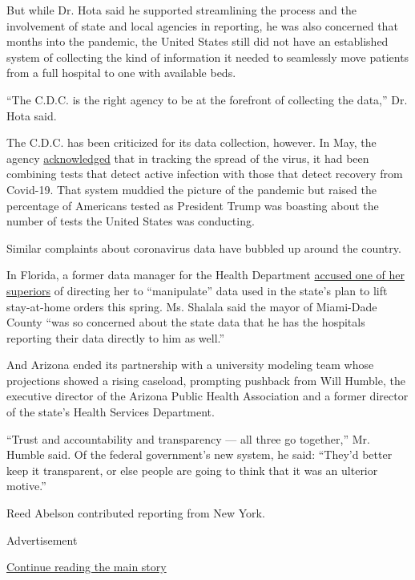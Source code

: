 But while Dr. Hota said he supported streamlining the process and the
involvement of state and local agencies in reporting, he was also
concerned that months into the pandemic, the United States still did not
have an established system of collecting the kind of information it
needed to seamlessly move patients from a full hospital to one with
available beds.

``The C.D.C. is the right agency to be at the forefront of collecting
the data,'' Dr. Hota said.

The C.D.C. has been criticized for its data collection, however. In May,
the agency
\href{https://www.nytimes3xbfgragh.onion/2020/05/22/us/politics/coronavirus-tests-cdc.html}{acknowledged}
that in tracking the spread of the virus, it had been combining tests
that detect active infection with those that detect recovery from
Covid-19. That system muddied the picture of the pandemic but raised the
percentage of Americans tested as President Trump was boasting about the
number of tests the United States was conducting.

Similar complaints about coronavirus data have bubbled up around the
country.

In Florida, a former data manager for the Health Department
\href{https://www.tampabay.com/news/health/2020/05/22/ousted-manager-was-told-to-manipulate-covid-19-data-before-states-re-opening-she-says/}{accused
one of her superiors} of directing her to ``manipulate'' data used in
the state's plan to lift stay-at-home orders this spring. Ms. Shalala
said the mayor of Miami-Dade County ``was so concerned about the state
data that he has the hospitals reporting their data directly to him as
well.''

And Arizona ended its partnership with a university modeling team whose
projections showed a rising caseload, prompting pushback from Will
Humble, the executive director of the Arizona Public Health Association
and a former director of the state's Health Services Department.

``Trust and accountability and transparency --- all three go together,''
Mr. Humble said. Of the federal government's new system, he said:
``They'd better keep it transparent, or else people are going to think
that it was an ulterior motive.''

Reed Abelson contributed reporting from New York.

Advertisement

\protect\hyperlink{after-bottom}{Continue reading the main story}

